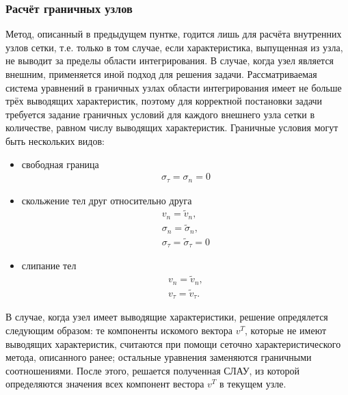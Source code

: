 \subsubsection{Расчёт граничных узлов}
Метод, описанный в предыдущем пунтке, годится лишь для расчёта внутренних узлов
сетки, т.е. только в том случае, если характеристика, выпущенная из узла, не
выводит за пределы области интегрирования. В случае, когда узел является
внешним, применяется иной подход для решения задачи. Рассматриваемая система
уравнений в граничных узлах области интегрирования имеет не больше трёх
\cite{chelnokov} выводящих характеристик, поэтому для корректной постановки
задачи требуется задание граничных условий для каждого внешнего узла сетки в
количестве, равном числу выводящих характеристик. Граничные условия могут быть
нескольких видов:
\begin{itemize}
\item{свободная граница
\begin{eqnarray}
\sigma_\tau=\sigma_n=0 \nonumber
\end{eqnarray}}
\item{скольжение тел друг относительно друга 
\begin{eqnarray}
v_n=\tilde{v}_n,\nonumber\\
\sigma_n=\tilde{\sigma}_n,\nonumber\\
\sigma_\tau=\tilde{\sigma}_\tau=0 \nonumber
\end{eqnarray}}
\item{слипание тел
\begin{eqnarray}
v_n=\tilde{v}_n,\nonumber\\
v_\tau=\tilde{v}_\tau.
\end{eqnarray}}
\end{itemize}
В случае, когда узел имеет выводящие характеристики, решение опредялется
следующим образом: те компоненты искомого вектора $v^T$, которые не имеют
выводящих характеристик, считаются при помощи сеточно характеристического
метода, описанного ранее; остальные уравнения заменяются граничными
соотношениями. После этого, решается полученная СЛАУ, из которой определяются
значения всех компонент вестора $v^T$ в текущем узле.